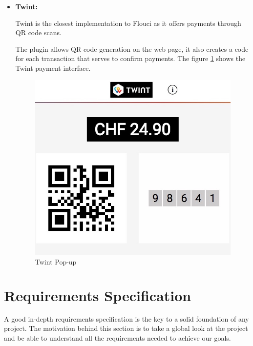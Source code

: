 \begin{spacing}{1.2}
\begin{itemize}
\item \textbf{Twint:}

Twint \cite{twint} is the closest implementation to Flouci as it offers payments through QR code scans.

The plugin allows QR code generation on the web page, it also creates a code for each transaction that serves to confirm payments.
The figure \ref{fig:twint} shows the Twint payment interface.

\begin{figure}[H]\centering
\includegraphics[scale=0.3]{twint.jpg}
\caption{Twint Pop-up}
\label{fig:twint}
\end{figure}
  \end{itemize}



\section{Requirements Specification}
A good in-depth requirements specification is the key to a solid foundation of any project.
The motivation behind this section is to take a global look at the project and be able to understand all the requirements needed to achieve our goals.

\end{spacing}
